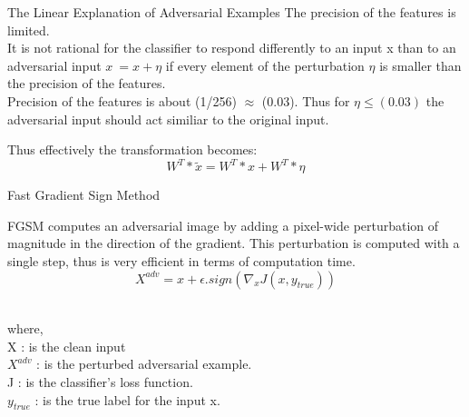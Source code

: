 \documentclass[10pt]{beamer}
\begin{document}
\begin{frame}{The Linear Explanation of Adversarial Examples}
        The precision of the features is limited.\\\bigskip
        It is not rational for the classifier to respond differently to an input x than to an adversarial input $ x~ = x + \eta$  if every element of the perturbation $\eta$ is smaller than the precision of the features.\\\bigskip
        Precision of the features is about (1/256) $\approx$ (0.03).
        Thus for $\eta \leq (0.03)$ the adversarial input should act similiar to the original input.\\\bigskip
        
        Thus effectively the transformation becomes:\\
        {$$ W^{T}*\widetilde{x} = W^{T}*x + W^{T}*\eta $$}
\end{frame}

\begin{frame}{Fast Gradient Sign Method}
        
        FGSM computes an adversarial image by adding a pixel-wide perturbation of magnitude in the direction of the gradient. This perturbation is computed with a single step, thus is very efficient in terms of computation time.\\
        
        {$$ X^{adv} = x + \epsilon . sign(\nabla_{x}J(x, y_{true}))$$}\\\bigskip
        
        \begin{flushleft}
        where,\\
        X : is the clean input\\
        $X^{adv}$ : is the perturbed adversarial example.\\
        J : is the classifier's loss function.\\
        $y_{true}$ : is the true label for the input x.\\
        \end{flushleft}
        
\end{frame}
\end{document}

